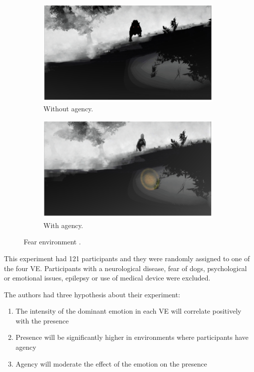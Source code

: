 \begin{figure}[!h] 
    \begin{subfigure}{0.45\textwidth}
    \centering
    \includegraphics[width=\textwidth]{Revisao/Emotion Presence/Scene Fear No.png}
    \caption{Without agency.} 
    \label{fig:fear_without}
  \end{subfigure}
  \hfill
  \begin{subfigure}{0.45\textwidth}
    \centering
    \includegraphics[width=\textwidth]{Revisao/Emotion Presence/Scene Fear Yes.png}
    \caption{With agency.} 
    \label{fig:fear_with}
  \end{subfigure}
\caption{Fear environment \cite{jicol2021effects}.} 
\label{fig:fear_environment}
\end{figure}

This experiment had 121 participants and they were randomly assigned to one of the four VE. Participants with a neurological disease, fear of dogs, psychological or emotional issues, epilepsy or use of medical device were excluded.

The authors had three hypothesis about their experiment:
\begin{enumerate}
    \item The intensity of the dominant emotion in each VE will correlate positively with the presence
    \item Presence will be significantly higher in environments where participants have agency
    \item Agency will moderate the effect of the emotion on the presence
\end{enumerate}

